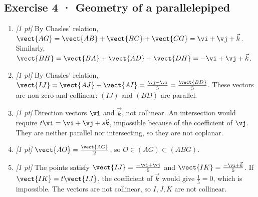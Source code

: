 \subsection*{Exercise 4 · Geometry of a parallelepiped}\begin{enumerate}

\item \textit{[1 pt]} By Chasles' relation, $\vect{AG}=\vect{AB}+\vect{BC}+\vect{CG}=\vi +\vj +\vec k$. Similarly, $\vect{BH}=\vect{BA}+\vect{AD}+\vect{DH}=-\vi +\vj +\vec k$.

\item \textit{[1 pt]} By Chasles' relation, $\vect{IJ}=\vect{AJ}-\vect{AI}=\frac{\vj -\vi }{5}=\frac{\vect{BD}}{5}$. These vectors are non-zero and collinear: $(IJ)$ and $(BD)$ are parallel.

\item \textit{[1 pt]} Direction vectors $\vi $ and $\vec k$, not collinear. An intersection would require $t\vi =\vi +\vj +s\vec k$, impossible because of the coefficient of $\vj $. They are neither parallel nor intersecting, so they are not coplanar.

\item \textit{[1 pt]} $\vect{AO}=\frac{\vect{AG}}{2}$, so $O\in(AG)\subset(ABG)$.

\item \textit{[1 pt]} The points satisfy $\vect{IJ}=\frac{-\vi +\vj }{5}$ and $\vect{IK}=\frac{-\vi +\vec k}{5}$. If $\vect{IK}=t\vect{IJ}$, the coefficient of $\vec k$ would give $\frac{1}{5}=0$, which is impossible. The vectors are not collinear, so $I,J,K$ are not collinear.

\end{enumerate}

\fi

\fi


